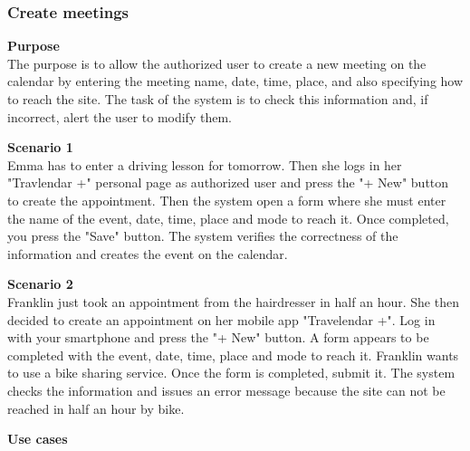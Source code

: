 \documentclass{article}
\begin{document}
	\subsubsection{Create meetings}
	
	\bigskip
	\noindent
	\textbf{Purpose} \\
	The purpose is to allow the authorized user to create a new meeting on the calendar by entering the meeting name, date, time, place, and also specifying how to reach the site. The task of the system is to check this information and, if incorrect, alert the user to modify them.
	
	\bigskip
	\noindent
	\textbf{Scenario 1} \\
	Emma has to enter a driving lesson for tomorrow. Then she logs in her "Travlendar +" personal page as authorized user and press the "+ New" button to create the appointment. Then the system open a form where she must enter the name of the event, date, time, place and mode to reach it. Once completed, you press the "Save" button. The system verifies the correctness of the information and creates the event on the calendar.
	
	\bigskip
	\noindent
	\textbf{Scenario 2} \\
	Franklin just took an appointment from the hairdresser in half an hour. She then decided to create an appointment on her mobile app "Travelendar +". Log in with your smartphone and press the "+ New" button. A form appears to be completed with the event, date, time, place and mode to reach it. Franklin wants to use a bike sharing service. Once the form is completed, submit it. The system checks the information and issues an error message because the site can not be reached in half an hour by bike.
	
	\bigskip
	\noindent
	\textbf{Use cases} \\
	
\end{document}
